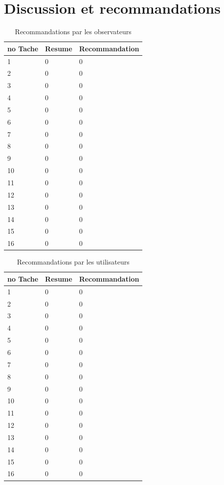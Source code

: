 \documentclass[letterpaper, oneside, 12pt, these, creativecommons]{thETS}
\begin{document}
\newpage

\section{Discussion et recommandations}

\begin{table}
	\centering
	\begin{tabular}{|l|l|l|}
	\hline
	no Tache	& Resume	& Recommandation 	\\ \hline
	1		& 0		& 0 			\\ \hline
	2		& 0		& 0 			\\ \hline
	3		& 0		& 0 			\\ \hline
	4		& 0		& 0 			\\ \hline
	5		& 0		& 0 			\\ \hline
	6		& 0		& 0 			\\ \hline
	7		& 0		& 0 			\\ \hline
	8		& 0		& 0 			\\ \hline
	9		& 0		& 0 			\\ \hline
	10		& 0		& 0 			\\ \hline
	11		& 0		& 0 			\\ \hline
	12		& 0		& 0 			\\ \hline
	13		& 0		& 0 			\\ \hline
	14		& 0		& 0 			\\ \hline
	15		& 0		& 0 			\\ \hline
	16		& 0		& 0 			\\ \hline
	\end{tabular}
	\caption{Recommandations par les observateurs}
\end{table}

\begin{table}
	\centering
	\begin{tabular}{|l|l|l|}
	\hline
	no Tache	& Resume	& Recommandation 	\\ \hline
	1		& 0		& 0 			\\ \hline
	2		& 0		& 0 			\\ \hline
	3		& 0		& 0 			\\ \hline
	4		& 0		& 0 			\\ \hline
	5		& 0		& 0 			\\ \hline
	6		& 0		& 0 			\\ \hline
	7		& 0		& 0 			\\ \hline
	8		& 0		& 0 			\\ \hline
	9		& 0		& 0 			\\ \hline
	10		& 0		& 0 			\\ \hline
	11		& 0		& 0 			\\ \hline
	12		& 0		& 0 			\\ \hline
	13		& 0		& 0 			\\ \hline
	14		& 0		& 0 			\\ \hline
	15		& 0		& 0 			\\ \hline
	16		& 0		& 0 			\\ \hline
	\end{tabular}
	\caption{Recommandations par les utilisateurs}
\end{table}
\end{document}
